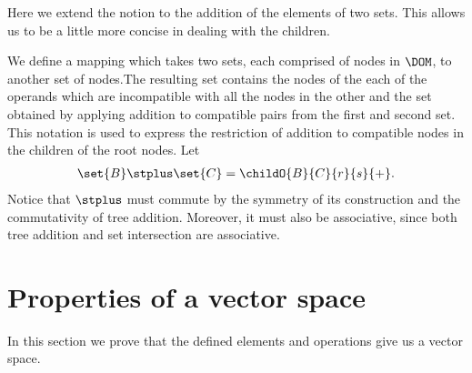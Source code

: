 Here we extend the notion to the addition of the elements of two
sets. This allows us to be a little more concise in dealing with the
children.

\begin{definition}[Notation]
  We define a mapping which takes two sets, each comprised of nodes in
  $\DOM$, to another set of nodes.The resulting set contains the nodes
  of the each of the operands which are incompatible with all the
  nodes in the other and the set obtained by applying addition to
  compatible pairs from the first and second set. This notation is
  used to express the restriction of addition to compatible nodes in
  the children of the root nodes.  Let
  \begin{align*}
      \set{B}\stplus\set{C} = \childO{B}{C}{r}{s}{+}.
  \end{align*}
  Notice that $\stplus$ must commute by the symmetry of its construction and the
  commutativity of tree addition. Moreover, it must also be associative, since both tree 
  addition and set intersection are associative.
\end{definition}

\section{Properties of a vector space}
In this section we prove that the defined elements and operations give
us a vector space.  

